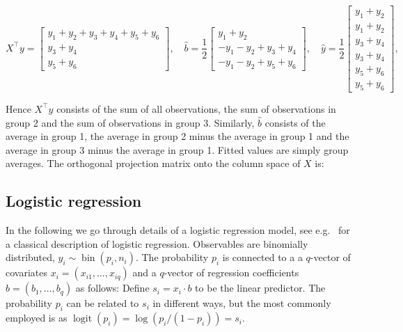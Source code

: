 \documentclass[10pt,]{article}
\newenvironment{Shaded}{\begin{snugshade}}{\end{snugshade}}
\newcommand{\KeywordTok}[1]{\textcolor[rgb]{0.13,0.29,0.53}{\textbf{#1}}}
\newcommand{\NormalTok}[1]{#1}
\newcommand{\OperatorTok}[1]{\textcolor[rgb]{0.81,0.36,0.00}{\textbf{#1}}}
\newcommand{\StringTok}[1]{\textcolor[rgb]{0.31,0.60,0.02}{#1}}
\DeclareMathOperator{\logit}{logit}
\DeclareMathOperator{\bin}{bin}
\begin{document}
\[
X^\top y = \left[\begin{matrix}y_{1} + y_{2} + y_{3} + y_{4} + y_{5} + y_{6}\\y_{3} + y_{4}\\y_{5} + y_{6}\end{matrix}\right],
\quad
\hat{{b}} = \frac{1}{2}  \left[\begin{matrix}y_{1} + y_{2}\\- y_{1} - y_{2} + y_{3} + y_{4}\\- y_{1} - y_{2} + y_{5} + y_{6}\end{matrix}\right] ,
\quad
\hat{y} = \frac{1}{2}  \left[\begin{matrix}y_{1} + y_{2}\\y_{1} + y_{2}\\y_{3} + y_{4}\\y_{3} + y_{4}\\y_{5} + y_{6}\\y_{5} + y_{6}\end{matrix}\right],
\]

Hence \(X^\top y\) consists of the sum of all observations, the sum of
observations in group 2 and the sum of observations in group 3.
Similarly, \(\hat{b}\) consists of the average in group 1, the average
in group 2 minus the average in group 1 and the average in group 3 minus
the average in group 1. Fitted values are simply group averages. The
orthogonal projection matrix onto the column space of \(X\) is:

\begin{Shaded}
\end{Shaded}

\hypertarget{sec:logistic}{%
\subsection{Logistic regression}\label{sec:logistic}}

In the following we go through details of a logistic regression model,
see e.g.~\citep{mccullagh:etal:89} for a classical description of
logistic regression. Observables are binomially distributed,
\(y_i \sim \bin(p_i, n_i)\). The probability \(p_i\) is connected to a a
\(q\)-vector of covariates \(x_i=(x_{i1}, \dots, x_{iq})\) and a
\(q\)-vector of regression coefficients \(b=(b_1, \dots, b_q)\) as
follows: Define \(s_i = x_i \cdot b\) to be the linear predictor. The
probability \(p_i\) can be related to \(s_i\) in different ways, but the
most commonly employed is as \(\logit(p_i) = \log(p_i/(1-p_i)) = s_i\).
\end{document}
